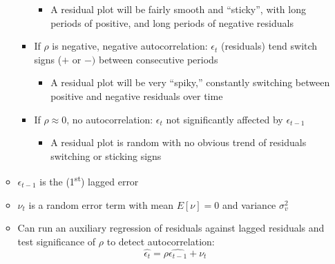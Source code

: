 \documentclass{article}
\begin{document}
\begin{itemize}
\begin{itemize}
\begin{itemize}
  					\begin{itemize}
  						\item A residual plot will be fairly smooth and ``sticky'', with long periods of positive, and long periods of negative residuals	
  					\end{itemize}
					\item If $\rho$ is negative, negative autocorrelation: $\epsilon_t$ (residuals) tend switch signs ($+$ or $-)$ between consecutive periods
					\begin{itemize}
						\item A residual plot will be very ``spiky,'' constantly switching between positive and negative residuals over time
					\end{itemize}
  					\item If $\rho \approx 0$, no autocorrelation: $\epsilon_t$ not significantly affected by $\epsilon_{t-1}$
  					\begin{itemize}
  						\item A residual plot is random with no obvious trend of residuals switching or sticking signs
  					\end{itemize}
  			\end{itemize}
  			\item $\epsilon_{t-1}$ is the (1\textsuperscript{st}) lagged error
  			\item $\nu_t$ is a random error term with mean $E[\nu]=0$ and variance $\sigma^2_{v}$
  			\item Can run an auxiliary regression of residuals against lagged residuals and test significance of $\rho$ to detect autocorrelation:
  			\begin{equation*}
		\hat{\epsilon_t}=\rho \widehat{\epsilon_{t-1}}+\nu_t	
		\end{equation*}
		

\end{itemize}
\end{itemize}
\end{document}

